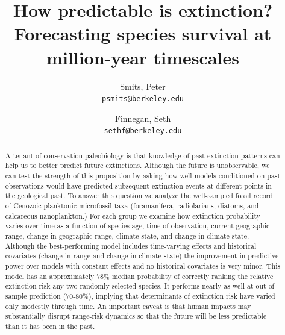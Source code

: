 \documentclass[12pt,letterpaper]{article}
\title{How predictable is extinction? Forecasting species survival at million-year timescales}
\author{
  Smits, Peter\\
  \texttt{psmits@berkeley.edu} 
  \and
  Finnegan, Seth\\
  \texttt{sethf@berkeley.edu}
}
\date{}
\begin{document}
\begin{refsection}

\maketitle

\linenumbers{}
\modulolinenumbers[3]

\begin{abstract}
  A tenant of conservation paleobiology is that knowledge of past extinction patterns can help us to better predict future extinctions. Although the future is unobservable, we can test the strength of this proposition by asking how well models conditioned on past observations would have predicted subsequent extinction events at different points in the geological past. To answer this question we analyze the well-sampled fossil record of Cenozoic planktonic microfossil taxa (foramanifera, radiolarians, diatoms, and calcareous nanoplankton.) For each group we examine how extinction probability varies over time as a function of species age, time of observation, current geographic range, change in geographic range, climate state, and change in climate state. Although the best-performing model includes time-varying effects and historical covariates (change in range and change in climate state) the improvement in predictive power over models with constant effects and no historical covariates is very minor. This model has an approximately 78\% median probability of correctly ranking the relative extinction risk any two randomly selected species. It performs nearly as well at out-of-sample prediction (70-80\%), implying that determinants of extinction risk have varied only modestly through time. An important caveat is that human impacts may substantially disrupt range-risk dynamics so that the future will be less predictable than it has been in the past.


\end{abstract}
\end{refsection}
\end{document}

